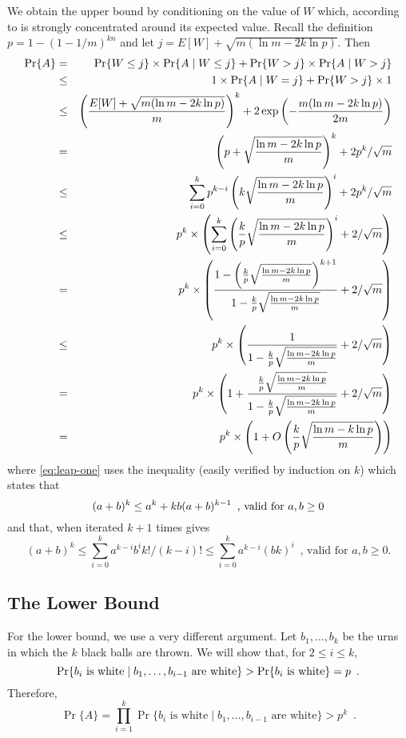 \documentclass[lotsofwhite]{patmorin}
\newcommand{\blah}{\frac{k}{p}\sqrt{\frac{\ln m-2k\ln p}{m}}}
\begin{document}
We obtain the upper bound by conditioning on the value of $W$ which,
according to  is strongly concentrated around its
expected value.  Recall the definition $p=1-(1-1/m)^{kn}$ and let
$j=E[W]+ \sqrt{m(\ln m-2k\ln p)}$. Then
\begin{eqnarray}
\Pr\{A\} & = & 
 \Pr\{W \le j\}\times\Pr\{A\mid W\le j\} +
	\Pr\{W >j\} \times \Pr\{A\mid W > j\} \\
  &\le&  1\times\Pr\{A\mid W= j\} +
	\Pr\{W >j\} \times 1 \\
  &\le& \left(\frac{E[W]+\sqrt{m(\ln m-2k\ln p)}}{m}\right)^k + 
       2\exp\left(-\frac{m(\ln m-2k\ln p)}{2m}\right) \\
   &=& \left(p + \sqrt{\frac{\ln m-2k\ln p}{m}}\right)^k+ 
       2p^k/\sqrt{m}  \\  \eqlabel{leap-one}
   &\le& 
	\sum_{i=0}^kp^{k-i}\left(k\sqrt{\frac{\ln m-2k\ln p}{m}}\right)^i 
		+ 2p^k/\sqrt{m} \\
   &\le& p^k\times\left( 
	\sum_{i=0}^k\left(\blah\right)^i 
		+ 2/\sqrt{m}\right) \\
   &=& p^k \times \left(
	\frac{1-\left(\blah\right)^{k+1}}
		{1-\blah}
	+ 2/\sqrt{m} \right) \\
   &\le& p^k \times \left(
	\frac{1}{1-\blah}
	+ 2/\sqrt{m} \right) \\
   &=& p^k \times \left(1+
	\frac{\blah}{1-\blah}
	+ 2/\sqrt{m} \right) \\
   &=& p^k \times \left(1+ O\left(\frac{k}{p}\sqrt{\frac{\ln m-k\ln
p}{m}}\right)\right)
\end{eqnarray}
where \eqref{eq:leap-one} uses the inequality (easily verified by induction
on $k$) which states that
\[
   (a+b)^k \le a^k + kb(a+b)^{k-1}\enspace\mbox{, valid for $a,b \ge 0$} 
\eqlabel{binomial}
\]
and that, when iterated $k+1$ times gives
\[
(a+b)^k \le \sum_{i=0}^k a^{k-i}b^ik!/(k-i)! \le \sum_{i=0}^k a^{k-i}(bk)^i
 \enspace\mbox{, valid for $a,b \ge 0$.}
\]

\subsection{The Lower Bound}
For the lower bound, we use a very different argument.  Let
$b_1,\ldots,b_k$ be the urns in which the $k$ black balls are thrown.
We will show that, for $2\le i\le k$,
\begin{equation}
	\Pr\{\mbox{$b_i$ is white} \mid \mbox{$b_1,\ldots,b_{i-1}$ are white}\}
           > \Pr\{\mbox{$b_i$ is white}\} = p \enspace .
	\eqlabel{conditional}
\end{equation}
Therefore,
\[
	\Pr\{A\}=\prod_{i=1}^k \Pr\{\mbox{$b_i$ is white} \mid
	\mbox{$b_1,\ldots,b_{i-1}$ are white}\} > p^k \enspace .
\]
\end{document}
